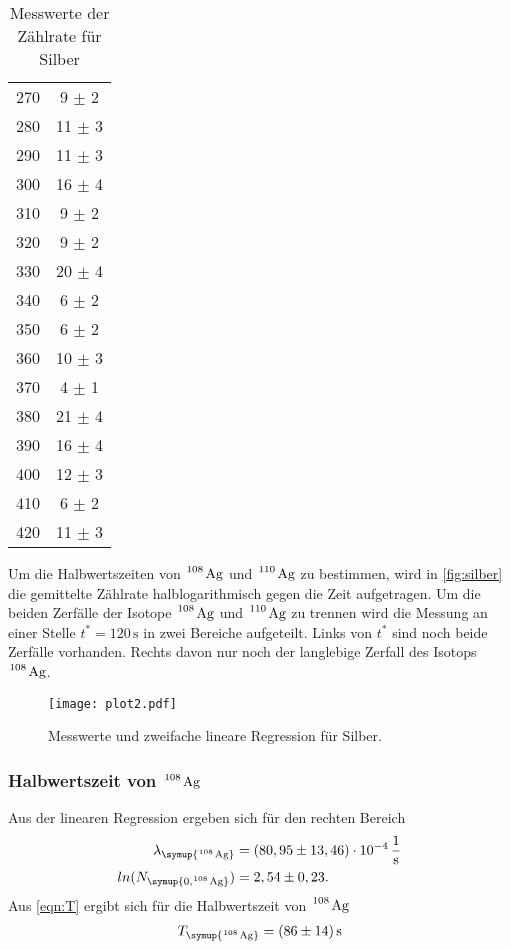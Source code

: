 \begin{table}
\begin{tabular}{c c}
    270 &  9 $\pm$ 2 \\
    280 & 11 $\pm$ 3 \\
    290 & 11 $\pm$ 3 \\
    300 & 16 $\pm$ 4 \\
    310 &  9 $\pm$ 2 \\
    320 &  9 $\pm$ 2 \\
    330 & 20 $\pm$ 4 \\
    340 &  6 $\pm$ 2 \\
    350 &  6 $\pm$ 2 \\
    360 & 10 $\pm$ 3 \\
    370 &  4 $\pm$ 1 \\
    380 & 21 $\pm$ 4 \\
    390 & 16 $\pm$ 4 \\
    400 & 12 $\pm$ 3 \\
    410 &  6 $\pm$ 2 \\
    420 & 11 $\pm$ 3 \\
    \bottomrule
  \end{tabular}
  \caption{Messwerte der Zählrate für Silber}
  \label{tab:silber}
\end{table}
Um die Halbwertszeiten von $\ce{^108 Ag}$ und $\ce{^110 Ag}$ zu bestimmen, wird in \autoref{fig:silber} die gemittelte Zählrate
halblogarithmisch gegen die Zeit aufgetragen. Um die beiden Zerfälle der Isotope $\ce{^108 Ag}$ und $\ce{^110 Ag}$
zu trennen wird die Messung an einer Stelle $t^{*} = 120 \,\unit{\second}$ in zwei Bereiche aufgeteilt. Links von
$t^{*}$ sind noch beide Zerfälle vorhanden. Rechts davon nur noch der langlebige Zerfall des Isotops $\ce{^108 Ag}$.
\begin{figure}
  \centering
  \texttt{[image: plot2.pdf]}
  \caption{Messwerte und zweifache lineare Regression für Silber.}
  \label{fig:silber}
\end{figure}

\subsubsection{Halbwertszeit von $\ce{^108 Ag}$}
\label{sec:108Ag}
Aus der linearen Regression ergeben sich für den rechten Bereich
\begin{align*}
  \lambda_{\symup{\ce{^108 Ag}}}  &= (80,95 \pm 13,46)\cdot 10^{-4}\,\frac{1}{\unit{\second}} \\
  ln(N_{\symup{0, \ce{^108 Ag}}}) &= 2,54 \pm 0,23. \\
\end{align*}
Aus \autoref{eqn:T} ergibt sich für die Halbwertszeit von $\ce{^108 Ag}$
\begin{align*}
  T_{\symup{\ce{^108 Ag}}} = (86 \pm 14)\,\unit{\second} 
\end{align*}

